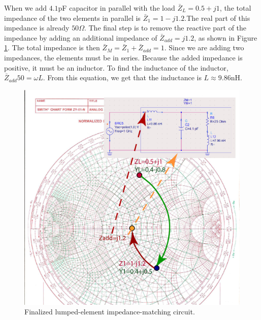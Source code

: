 \documentclass{ximera}
\begin{document}
When we add $4.1$pF capacitor in parallel with the load $\bar{Z}_L=0.5+j1$, the total impedance of the two elements in parallel is $\bar{Z}_1=1-j1.2$.The real part of this impedance is already $50\Omega$. The final step is to remove the reactive part of the impedance by adding an additional impedance of $\bar{Z}_{add}=j1.2$, as shown in Figure \ref{fig:LumpedImpM3}. The total impedance is then $\bar{Z}_M=\bar{Z}_1+\bar{Z}_{add}=1$. Since we are adding two impedances, the elements must be in series. Because the added impedance is positive, it must be an inductor. To find the inductance of the inductor, $\bar{Z}_{add} 50=\omega L$. From this equation, we get that the inductance is $L \approx 9.86 $nH.



\begin{figure}[htbp]
\begin{center}
\includegraphics[scale=1]{../jpg/LumpedMatch3-01.jpg}
\end{center}
\caption{Finalized lumped-element impedance-matching circuit.}
\label{fig:LumpedImpM3}
\end{figure}
\end{document}
